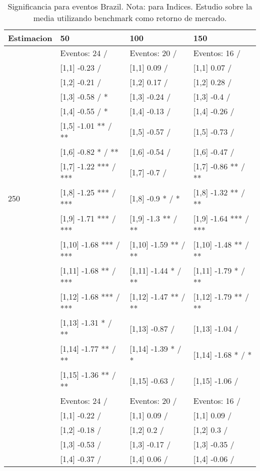 \begin{table}

\caption{Significancia para eventos Brazil. Nota: para Indices. Estudio sobre la media utilizando benchmark como retorno de mercado.}
\centering
\begin{tabular}[t]{llll}
\toprule
Estimacion & 50 & 100 & 150\\
\midrule
 & Eventos:  24 / & Eventos:  20 / & Eventos:  16 /\\
 & {}[1,1] -0.23  / & {}[1,1] 0.09  / & {}[1,1] 0.07  /\\
 & {}[1,2] -0.21  / & {}[1,2] 0.17  / & {}[1,2] 0.28  /\\
 & {}[1,3] -0.58  / * & {}[1,3] -0.24  / & {}[1,3] -0.4  /\\
 & {}[1,4] -0.55  / * & {}[1,4] -0.13  / & {}[1,4] -0.26  /\\
\addlinespace
 & {}[1,5] -1.01 ** / ** & {}[1,5] -0.57  / & {}[1,5] -0.73  /\\
 & {}[1,6] -0.82 * / ** & {}[1,6] -0.54  / & {}[1,6] -0.47  /\\
 & {}[1,7] -1.22 *** / *** & {}[1,7] -0.7  / & {}[1,7] -0.86 ** / **\\
250 & {}[1,8] -1.25 *** / *** & {}[1,8] -0.9 * / * & {}[1,8] -1.32 ** / **\\
 & {}[1,9] -1.71 *** / *** & {}[1,9] -1.3 ** / ** & {}[1,9] -1.64 *** / ***\\
\addlinespace
 & {}[1,10] -1.68 *** / *** & {}[1,10] -1.59 ** / ** & {}[1,10] -1.48 ** / **\\
 & {}[1,11] -1.68 ** / *** & {}[1,11] -1.44 * / ** & {}[1,11] -1.79 * / **\\
 & {}[1,12] -1.68 *** / *** & {}[1,12] -1.47 ** / ** & {}[1,12] -1.79 ** / **\\
 & {}[1,13] -1.31 * / ** & {}[1,13] -0.87  / & {}[1,13] -1.04  /\\
 & {}[1,14] -1.77 ** / ** & {}[1,14] -1.39 * / * & {}[1,14] -1.68 * / *\\
\addlinespace
 & {}[1,15] -1.36 ** / ** & {}[1,15] -0.63  / & {}[1,15] -1.06  /\\
 & Eventos:  24 / & Eventos:  20 / & Eventos:  16 /\\
 & {}[1,1] -0.22  / & {}[1,1] 0.09  / & {}[1,1] 0.09  /\\
 & {}[1,2] -0.18  / & {}[1,2] 0.2  / & {}[1,2] 0.3  /\\
 & {}[1,3] -0.53  / & {}[1,3] -0.17  / & {}[1,3] -0.35  /\\
\addlinespace
 & {}[1,4] -0.37  / & {}[1,4] 0.06  / & {}[1,4] -0.06  /\\

\end{tabular}
\end{table}
